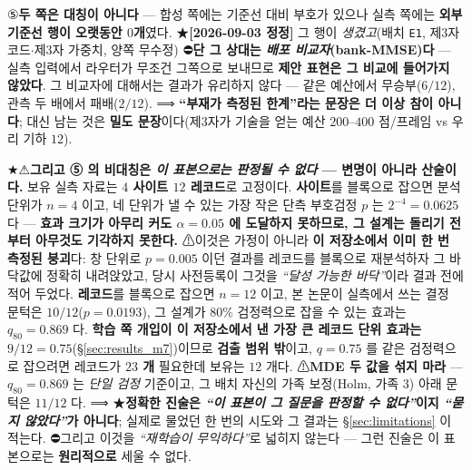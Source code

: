 \documentclass[11pt]{report}
\numberwithin{equation}{chapter}
\numberwithin{figure}{chapter}
\numberwithin{table}{chapter}
\begin{document}
⑤\textbf{두 쪽은 대칭이 아니다} --- 합성 쪽에는 기준선 대비 부호가 있으나 실측 쪽에는
\textbf{외부 기준선 행이 오랫동안 $0$개}였다. ★\textbf{[2026-09-03 정정]} 그 행이
\emph{생겼고}(배치 \texttt{E1}, 제3자 코드$\cdot$제3자 가중치, 양쪽 무수정)
⛔\textbf{단 그 상대는 \emph{배포 비교자}(bank-MMSE)다} --- 실측 입력에서 라우터가
무조건 그쪽으로 보내므로 \textbf{제안 표현은 그 비교에 들어가지 않았다}.
그 비교자에 대해서는 결과가 유리하지 않다 --- 같은 예산에서 무승부($6/12$),
관측 두 배에서 패배($2/12$).
⟹ \textbf{``부재가 측정된 한계''라는 문장은 더 이상 참이 아니다}; 대신 남는 것은
\textbf{밀도 문장}이다(제3자가 기술을 얻는 예산 $200$--$400$ 점/프레임 vs 우리 기하 $12$).

★⚠\textbf{그리고 ⑤ 의 비대칭은 \emph{이 표본으로는 판정될 수 없다} --- 변명이 아니라
산술이다.} 보유 실측 자료는 \textbf{$4$ 사이트 $12$ 레코드}로 고정이다.
\textbf{사이트}를 블록으로 잡으면 분석 단위가 $n = 4$ 이고, 네 단위가 낼 수 있는 가장
작은 단측 부호검정 $p$ 는 $2^{-4} = 0.0625$ 다 --- \textbf{효과 크기가 아무리 커도
$\alpha = 0.05$ 에 도달하지 못하므로, 그 설계는 돌리기 전부터 아무것도 기각하지 못한다.}
⚠이것은 가정이 아니라 \textbf{이 저장소에서 이미 한 번 측정된 붕괴}다: 창 단위로
$p = 0.005$ 이던 결과를 레코드를 블록으로 재분석하자 그 바닥값에 정확히 내려앉았고,
당시 사전등록이 그것을 \emph{``달성 가능한 바닥''}이라 결과 전에 적어 두었다.
\textbf{레코드}를 블록으로 잡으면 $n = 12$ 이고, 본 논문이 실측에서 쓰는 결정 문턱은
$10/12$($p = 0.0193$), 그 설계가 $80\%$ 검정력으로 잡을 수 있는 효과는
$q_{80} = 0.869$ 다. \textbf{학습 쪽 개입이 이 저장소에서 낸 가장 큰 레코드 단위 효과는
$9/12 = 0.75$}(\S\ref{sec:results_m7})이므로 \textbf{검출 범위 밖}이고, $q = 0.75$ 를
같은 검정력으로 잡으려면 레코드가 \textbf{$23$ 개} 필요한데 보유는 $12$ 개다.
⚠\textbf{MDE 두 값을 섞지 마라} --- $q_{80} = 0.869$ 는 \emph{단일 검정} 기준이고,
그 배치 자신의 가족 보정(Holm, 가족 $3$) 아래 문턱은 $11/12$ 다.
⟹ ★\textbf{정확한 진술은 \emph{``이 표본이 그 질문을 판정할 수 없다''}이지
\emph{``묻지 않았다''}가 아니다}; 실제로 물었던 한 번의 시도와 그 결과는
\S\ref{sec:limitations} 이 적는다. ⛔그리고 이것을 \emph{``재학습이 무익하다''}로
넓히지 않는다 --- 그런 진술은 이 표본으로는 \textbf{원리적으로} 세울 수 없다.
\end{document}
